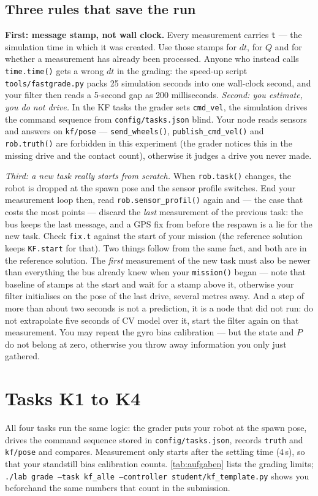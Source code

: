 \documentclass[12pt,a4paper]{scrartcl}
\newcommand{\thema}[1]{\texttt{#1}}
\newcommand{\ordner}[1]{\texttt{#1}}
\newcommand{\kommando}[1]{\texttt{#1}}
\begin{document}
\subsection{Three rules that save the run}
\textbf{First: message stamp, not wall clock.} Every measurement carries \thema{t} — the
simulation time in which it was created. Use those stamps for \(dt\), for \(Q\) and for
whether a measurement has already been processed. Anyone who instead calls
\kommando{time.time()} gets a wrong \(dt\) in the grading: the speed-up script
\ordner{tools/fastgrade.py} packs 25 simulation seconds into one wall-clock second,
and your filter then reads a 5-second gap as 200 milliseconds.
\emph{Second: you estimate, you do not drive.} In the KF tasks the grader sets
\thema{cmd\_vel}, the simulation drives the command sequence from \ordner{config/tasks.json}
blind. Your node reads sensors and answers on \thema{kf/pose} —
\kommando{send\_wheels()}, \kommando{publish\_cmd\_vel()} and \kommando{rob.truth()} are
forbidden in this experiment (the grader notices this in the missing drive and the contact
count), otherwise it judges a drive you never made.

\emph{Third: a new task really starts from scratch.} When \kommando{rob.task()}
changes, the robot is dropped at the spawn pose and the sensor profile switches. End your
measurement loop then, read \kommando{rob.sensor\_profil()} again and — the case that costs
the most points — discard the \emph{last} measurement of the previous task: the bus keeps
the last message, and a GPS fix from before the respawn is a lie for the new task. Check
\thema{fix.t} against the start of your mission (the reference solution keeps
\thema{KF.start} for that).
Two things follow from the same fact, and both are in the reference solution. The \emph{first}
measurement of the new task must also be newer than everything the bus already knew when your
\kommando{mission()} began — note that baseline of stamps at the start and wait for a stamp
above it, otherwise your filter initialises on the pose of the last drive, several metres
away. And a step of more than about two seconds is not a prediction, it is a node that did not
run: do not extrapolate five seconds of CV model over it, start the filter again on that
measurement.
You may repeat the gyro bias calibration — but the state and
\(P\) do not belong at zero, otherwise you throw away information you only just
gathered.

\section{Tasks K1 to K4}\label{sec:aufgaben}
All four tasks run the same logic: the grader puts your robot at the spawn pose, drives the
command sequence stored in \ordner{config/tasks.json}, records
\thema{truth} and \thema{kf/pose} and compares. Measurement only starts after the settling
time (4\,s), so that your standstill bias calibration counts. \cref{tab:aufgaben} lists the
grading limits; \kommando{./lab grade --task kf\_alle --controller student/kf\_template.py}
shows you beforehand the same numbers that count in the submission.
\end{document}
